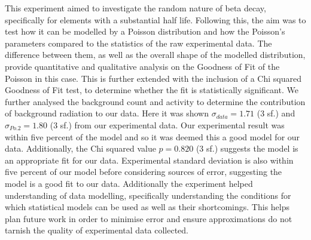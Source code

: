 \documentclass[11pt]{article}
\begin{document}
    This experiment aimed to investigate the random nature of beta decay, specifically for elements with a substantial half life. Following this, the aim was to test how it can be modelled by a Poisson distribution and how the Poisson's parameters compared to the statistics of the raw experimental data. The difference between them, as well as the overall shape of the modelled distribution, provide quantitative and qualitative analysis on the Goodness of Fit of the Poisson in this case. This is further extended with the inclusion of a Chi squared Goodness of Fit test, to determine whether the fit is statistically significant.  We further analysed the background count and activity to determine the contribution of background radiation to our data. 
    Here it was shown $\sigma_{data} = 1.71$ (3 sf.) and $\sigma_{Po.2} = 1.80$ (3 sf.) from our experimental data. Our experimental result was within five percent of the model and so it was deemed this a good model for our data. Additionally, the Chi squared value $p = 0.820$ (3 sf.) suggests the model is an appropriate fit for our data. Experimental standard deviation is also within five percent of our model before considering sources of error, suggesting the model is a good fit to our data. 
    Additionally the experiment helped understanding of data modelling, specifically understanding the conditions for which statistical models can be used as well as their shortcomings. This helps plan future work in order to minimise error and ensure approximations do not tarnish the quality of experimental data collected.

    
\end{document}
